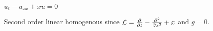 $u_t - u_{xx} + xu = 0$

\soln* Second order linear homogenous since $\mathcal{L} = \pdv{t} - \pdv[2]{x} + x$ and $g = 0$.